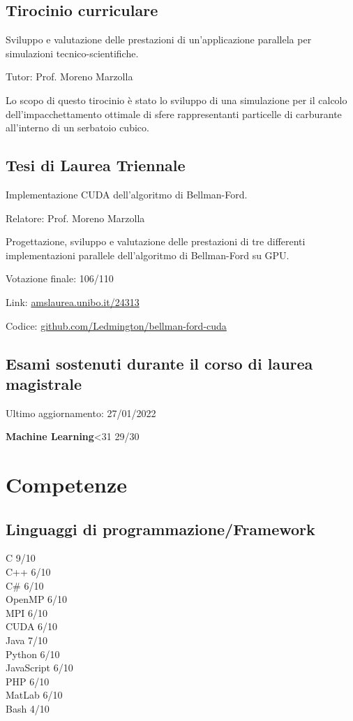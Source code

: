 \documentclass{article}
\newcommand{\https}[1]{\href{https://#1}{#1}}
\newcommand{\exam}[2]{\textbf{#1}\hfill \ifnum #2<31 {\Large #2}{\small /30} \else {\Large 30}{\small /30 con lode} \fi\\}
\newcommand{\skill}[2]{#1 #2/10}
\begin{document}
	\subsection*{Tirocinio curriculare}
	Sviluppo e valutazione delle prestazioni di un'applicazione parallela per simulazioni tecnico-scientifiche.
	
	Tutor: Prof. Moreno Marzolla
	
	Lo scopo di questo tirocinio è stato lo sviluppo di una simulazione per il calcolo dell'impacchettamento ottimale di sfere rappresentanti particelle di carburante all'interno di un serbatoio cubico.
	
	\subsection*{Tesi di Laurea Triennale}
	Implementazione CUDA dell'algoritmo di Bellman-Ford.
	
	Relatore: Prof. Moreno Marzolla
	
	Progettazione, sviluppo e valutazione delle prestazioni di tre differenti implementazioni parallele dell'algoritmo di Bellman-Ford su GPU.
	
	Votazione finale: 106/110
	
	Link: \https{amslaurea.unibo.it/24313}
	
	Codice: \https{github.com/Ledmington/bellman-ford-cuda}
	
	\subsection*{Esami sostenuti durante il corso di laurea magistrale}
	{\small Ultimo aggiornamento: 27/01/2022}
	\medskip
	
	\begin{minipage}[t]{.47\textwidth}
		\exam{Machine Learning}{29}
	\end{minipage}
	\hfill
	\begin{minipage}[t]{.47\textwidth}
	\end{minipage}
	
	\section*{Competenze}
	\subsection*{Linguaggi di programmazione/Framework}
	\skill{C}{9}\\
	\skill{C++}{6}\\
	\skill{C\#}{6}\\
	\skill{OpenMP}{6}\\
	\skill{MPI}{6}\\
	\skill{CUDA}{6}\\
	\skill{Java}{7}\\
	\skill{Python}{6}\\
	\skill{JavaScript}{6}\\
	\skill{PHP}{6}\\
	\skill{MatLab}{6}\\
	\skill{Bash}{4}
	
\end{document}
